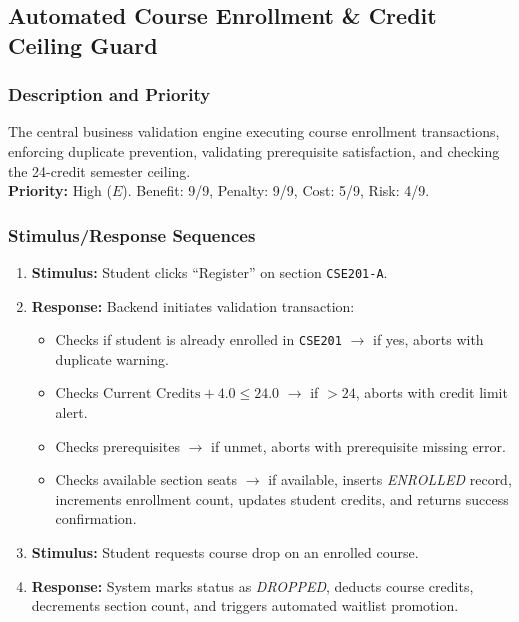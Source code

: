 \documentclass[a4paper,12pt]{article}
\begin{document}
\subsection{Automated Course Enrollment \& Credit Ceiling Guard}

\subsubsection{Description and Priority}
The central business validation engine executing course enrollment transactions, enforcing duplicate prevention, validating prerequisite satisfaction, and checking the 24-credit semester ceiling. \\
\textbf{Priority:} High ($E$). Benefit: 9/9, Penalty: 9/9, Cost: 5/9, Risk: 4/9.

\subsubsection{Stimulus/Response Sequences}
\begin{enumerate}[leftmargin=1.2cm]
    \item \textbf{Stimulus:} Student clicks ``Register'' on section \texttt{CSE201-A}.
    \item \textbf{Response:} Backend initiates validation transaction:
    \begin{itemize}
        \item Checks if student is already enrolled in \texttt{CSE201} $\to$ if yes, aborts with duplicate warning.
        \item Checks $\text{Current Credits} + 4.0 \le 24.0$ $\to$ if $> 24$, aborts with credit limit alert.
        \item Checks prerequisites $\to$ if unmet, aborts with prerequisite missing error.
        \item Checks available section seats $\to$ if available, inserts \textit{ENROLLED} record, increments enrollment count, updates student credits, and returns success confirmation.
    \end{itemize}
    \item \textbf{Stimulus:} Student requests course drop on an enrolled course.
    \item \textbf{Response:} System marks status as \textit{DROPPED}, deducts course credits, decrements section count, and triggers automated waitlist promotion.
\end{enumerate}
\end{document}

